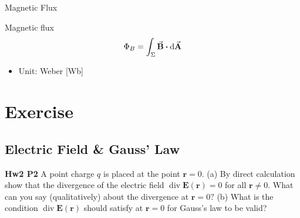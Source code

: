 \documentclass{beamer}
\begin{document}
\begin{frame}{Magnetic Flux}
    \begin{block}{Magnetic flux}
        \begin{equation}
            \Phi_B = \int_\Sigma \va{B} \vdot \dd{\va{A}}
        \end{equation}
    \end{block}
    \begin{itemize}
        \item Unit: Weber [Wb]
    \end{itemize}
\end{frame}




\section{Exercise}

\subsection{\bf Electric Field \& Gauss' Law}

\begin{frame}{\bf Hw2 P2}
A point charge $q$ is placed at the point $\mathbf{r}=0$.
(a) By direct calculation show that the divergence of the 
electric field $\operatorname{div} \mathbf{E}(\mathbf{r})=0$ 
for all $\mathbf{r} \neq 0 .$ What can you say (qualitatively) 
about the divergence at $\mathbf{r}=0 ?$
(b) What is the condition $\operatorname{div} \mathbf{E}(\mathbf{r})$ 
should satisfy at $\mathbf{r}=0$ for Gauss's law to be valid? 
\end{frame}
\end{document}
